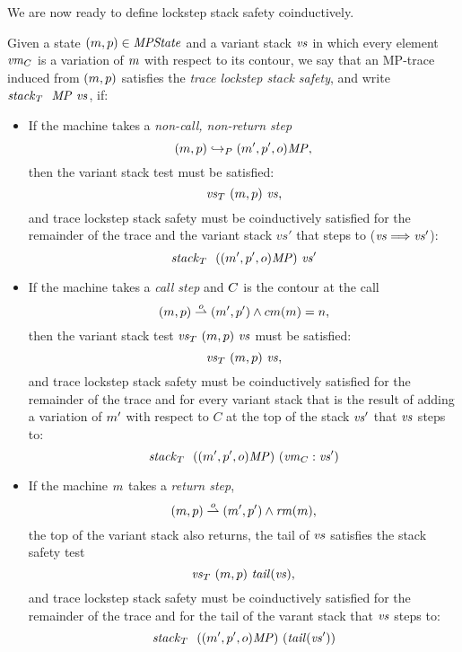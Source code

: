 \documentclass[acmsmall,review,anonymous]{acmart}\settopmatter{printfolios=true,printccs=false,printacmref=false}
\begin{document}
We are now ready to define lockstep stack safety coinductively.

 Given a state $(m, p) \in \mathit{MPState}$ and a variant stack
$\mathit{vs}$ in which every element $\mathit{vm}_{C}$ is a variation of $m$
with respect to its contour, we say that an MP-trace induced from
$(m, p)$ satisfies the \emph{trace lockstep stack safety}, and write
$\mathit{stack}_T ~  ~ \mathit{MP} ~ \mathit{vs}$, if:

\begin{itemize}

\item
  If the machine takes a \emph{non-call, non-return step}
  \[(m, p) \hookrightarrow_P (m', p', o)\mathit{MP},\]
  then the variant stack test must be satisfied:
  \[\mathit{\mathit{vs}}_T ~ (m, p) ~ \mathit{vs},\]
  and trace lockstep stack safety must be coinductively satisfied for
  the remainder of the trace and the variant stack $vs'$ that
  steps to ($\mathit{vs} \Longrightarrow \mathit{vs}'$):
  \[ \mathit{stack}_T ~  ~ ((m',p',o)\mathit{MP}) ~ \mathit{vs}'\]

\item
  If the machine takes a \emph{call step} and $C$ is the contour at
  the call
  \[(m, p) \overset{o}{\rightharpoonup} (m', p') \wedge cm(m) = n,\]
%
  then the variant stack test $\mathit{\mathit{vs}}_T ~ (m, p) ~ \mathit{vs}$ must be
  satisfied:
  \[\mathit{\mathit{vs}}_T ~ (m, p) ~ \mathit{vs},\]
%
%
  and trace lockstep stack safety must be coinductively satisfied
  for the remainder of the trace and for every variant stack
  that is the result of adding a variation of $m'$ with
  respect to $C$ at the top of the stack $\mathit{vs}'$ that $\mathit{vs}$ steps
  to:
  \[\mathit{stack}_T ~  ~ ((m', p', o)\mathit{MP}) ~ (\mathit{vm}_{C} : \mathit{vs}')\]

\item
%
  If the machine $m$ takes a \emph{return step},
  \[(m, p) \overset{o}{\rightharpoonup} (m', p') \wedge \mathit{rm}(m),\]
  the top of the variant stack also returns,
  the tail of $\mathit{vs}$ satisfies the stack safety test
  \[\mathit{\mathit{vs}}_T ~ (m, p) ~ \mathit{tail}(\mathit{vs}),\]
  and trace lockstep stack safety must be coinductively satisfied for
  the remainder of the trace and for the tail of the varant stack
  that $\mathit{vs}$ steps to:
  \[\mathit{stack}_T ~  ~ ((m', p', o)\mathit{MP}) ~ (\mathit{tail}(\mathit{vs}'))\]


\end{itemize}
\end{document}
